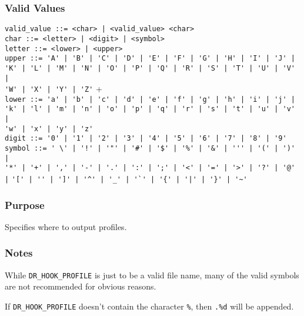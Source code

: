 \subsubsection{Valid Values}
\vspace{-2ex}
\verb+valid_value ::= <char> | <valid_value> <char>+ \\
\verb+char ::= <letter> | <digit> | <symbol>+ \\
\verb+letter ::= <lower> | <upper>+ \\
\verb+upper ::= 'A' | 'B' | 'C' | 'D' | 'E' | 'F' | 'G' | 'H' | 'I' | 'J' | +\\
 \verb+'K' | 'L' | 'M' | 'N' | 'O' | 'P' | 'Q' | 'R' | 'S' | 'T' | 'U' | 'V' |+\\
 \verb+'W' | 'X' | 'Y' | 'Z'+
+ \\
\verb+lower ::= 'a' | 'b' | 'c' | 'd' | 'e' | 'f' | 'g' | 'h' | 'i' | 'j' |+\\
\verb+'k' | 'l' | 'm' | 'n' | 'o' | 'p' | 'q' | 'r' | 's' | 't' | 'u' | 'v' |+\\
\verb+'w' | 'x' | 'y' | 'z'+\\
\verb+digit ::= '0' | '1' | '2' | '3' | '4' | '5' | '6' | '7' | '8' | '9'+ \\
\verb+symbol ::= ' \' | '!' | '"' | '#' | '$' | '%' | '&' | ''' | '(' | ')' |+\\
\verb!'*' | '+' | ',' | '-' | '.' | ':' | ';' | '<' | '=' | '>' | '?' | '@' |!
\verb!'[' | '' | ']' | '^' | '_' | '`' | '{' | '|' | '}' | '~'!

\vspace{-2ex}
\subsubsection{Purpose}
\vspace{-2ex}
Specifies where to output profiles.

\vspace{-2ex}
\subsubsection{Notes}
\vspace{-2ex}
While \texttt{DR\_HOOK\_PROFILE} is just to be a valid file name, many of the valid symbols are not recommended for obvious reasons.


If \texttt{DR\_HOOK\_PROFILE} doesn't contain the character \texttt{\%}, then \texttt{.\%d} will be appended.

